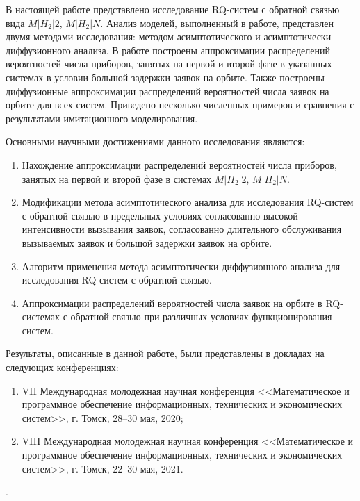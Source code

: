 В настоящей работе представлено исследование RQ-систем с обратной связью вида $M|H_{2}|2$, $M|H_{2}|N$. Анализ моделей, выполненный в работе, представлен двумя методами исследования: методом асимптотического и асимптотически диффузионного анализа. В работе построены аппроксимации распределений вероятностей числа приборов, занятых на первой и второй фазе в указанных системах в условии большой задержки заявок на орбите. Также построены диффузионные аппроксимации распределений вероятностей числа заявок на орбите для всех систем. Приведено несколько численных примеров и сравнения с результатами имитационного моделирования. 

Основными научными достижениями данного исследования являются:
\begin{enumerate} 
	\item Нахождение аппроксимации распределений вероятностей числа приборов, занятых на первой и второй фазе в системах $M|H_{2}|2$, $M|H_{2}|N$. 
	\item Модификации метода асимптотического анализа для исследования RQ-систем с обратной связью в предельных условиях согласованно высокой интенсивности вызывания заявок, согласованно длительного обслуживания вызываемых заявок и большой задержки заявок на орбите.
	\item Алгоритм применения метода асимптотически-диффузионного анализа для исследования RQ-систем с обратной связью.
	\item Аппроксимации распределений вероятностей числа заявок на орбите в RQ-системах с обратной связью при различных условиях функционирования систем.
\end{enumerate}

Результаты, описанные в данной работе, были представлены в докладах на следующих конференциях:
\begin{enumerate} 
	\item VII Международная молодежная научная конференция <<Математическое и программное обеспечение информационных, технических и экономических систем>>, г. Томск, 28--30 мая, 2020;
	\item VIII Международная молодежная научная конференция <<Математическое и программное обеспечение информационных, технических и экономических систем>>, г. Томск, 22--30 мая, 2021.
\end{enumerate}.
